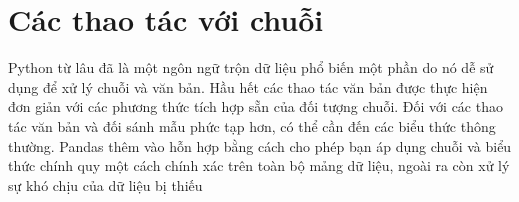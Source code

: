 \chapter{Các thao tác với chuỗi}
\setlength{\parindent}{0pt}
\begin{introchap4}
Python từ lâu đã là một ngôn ngữ trộn dữ liệu phổ biến một phần do nó dễ sử dụng để xử lý chuỗi và văn bản. Hầu hết các thao tác văn bản được thực hiện đơn giản với các phương thức tích hợp sẵn của đối tượng chuỗi. Đối với các thao tác văn bản và đối sánh mẫu phức tạp hơn, có thể cần đến các biểu thức thông thường. Pandas thêm vào hỗn hợp bằng cách cho phép bạn áp dụng chuỗi và biểu thức chính quy một cách chính xác trên toàn bộ mảng dữ liệu, ngoài ra còn xử lý sự khó chịu của dữ liệu bị thiếu
\end{introchap4}

